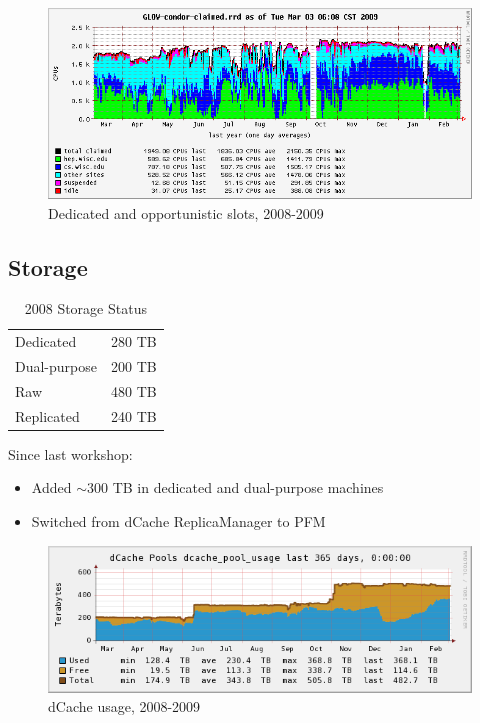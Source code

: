 \documentclass{beamer}
\newcommand{\ca}{\ensuremath{\sim}}
\begin{document}
\begin{frame}
\begin{figure}
    \includegraphics[width=\textwidth]{Graphics/GLOW-condor-claimed-1yr.png}
    \caption{Dedicated and opportunistic slots, 2008-2009}
\end{figure}
\end{frame}

\subsection{Storage}
\begin{frame}
\begin{table}
\begin{tabular}{lr}
    \toprule
    Dedicated       &   280 TB \\   %
    Dual-purpose    &   200 TB \\   %
    \midrule
    Raw             &   480 TB \\
    Replicated      &   240 TB \\
    \bottomrule
\end{tabular}
\caption{2008 Storage Status}
\label{2008_storage_status}
\end{table}

Since last workshop:
\begin{itemize}
    \item Added \ca{}300 TB in dedicated and dual-purpose machines
    \item Switched from dCache ReplicaManager to PFM
\end{itemize}
\end{frame}

\begin{frame}
\begin{figure}
    \includegraphics[width=\textwidth]{Graphics/dcache-usage-1yr.png}
    \caption{dCache usage, 2008-2009}
\end{figure}
\end{frame}
\end{document}
